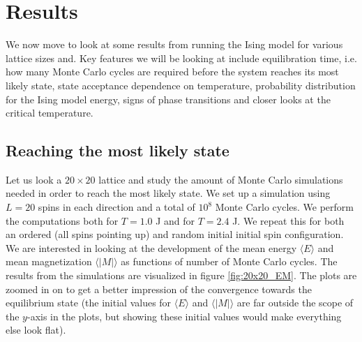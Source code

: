 \documentclass[12pt]{article}
\numberwithin{figure}{section}
\numberwithin{table}{section}
\begin{document}
\section{Results} \label{sec:results}
We now move to look at some results from running the Ising model for various lattice sizes and. Key features we will be looking at include equilibration time, i.e. how many Monte Carlo cycles are required before the system reaches its most likely state, state acceptance dependence on temperature, probability distribution for the Ising model energy, signs of phase transitions and closer looks at the critical temperature.

\subsection{Reaching the most likely state} \label{sec:most_likely_state}
Let us look a $20\times20$ lattice and study the amount of Monte Carlo simulations needed in order to reach the most likely state. We set up a simulation using $L=20$ spins in each direction and a total of $10^8$ Monte Carlo cycles. We perform the computations both for $T=1.0$ J and for $T=2.4$ J. We repeat this for both an ordered (all spins pointing up) and random initial initial spin configuration. We are interested in looking at the development of the mean energy $\langle E \rangle$ and mean magnetization $\langle |M| \rangle$ as functions of number of Monte Carlo cycles. The results from the simulations are visualized in figure \ref{fig:20x20_EM}. The plots are zoomed in on to get a better impression of the convergence towards the equilibrium state (the initial values for $\langle E \rangle$ and $\langle |M| \rangle$ are far outside the scope of the $y$-axis in the plots, but showing these initial values would make everything else look flat).
\end{document}

